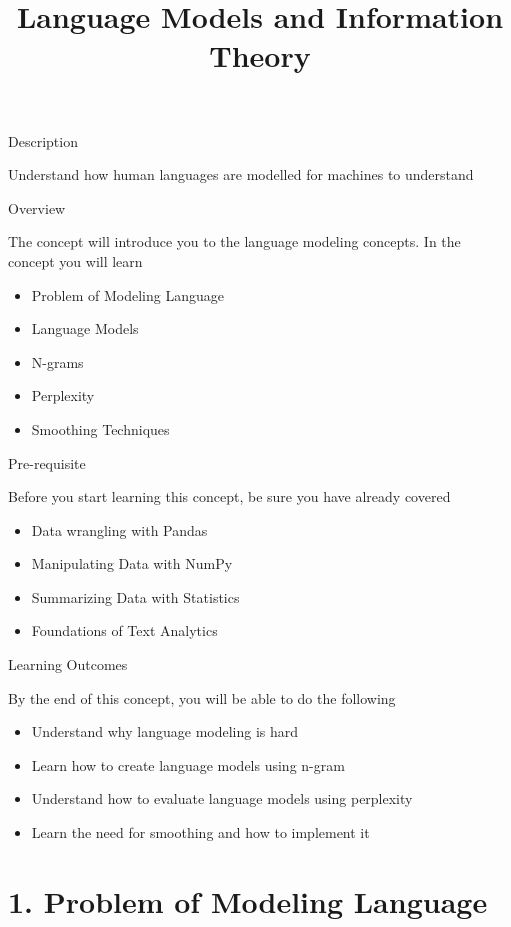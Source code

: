 \documentclass[11pt]{article}
\title{Language Models and Information Theory}
\providecommand{\tightlist}{%
      \setlength{\itemsep}{0pt}\setlength{\parskip}{0pt}}
\begin{document}
    
    
    \maketitle
    
    

    
    Description

Understand how human languages are modelled for machines to understand

Overview

The concept will introduce you to the language modeling concepts. In the
concept you will learn

\begin{itemize}
\item
  Problem of Modeling Language
\item
  Language Models
\item
  N-grams
\item
  Perplexity
\item
  Smoothing Techniques
\end{itemize}

Pre-requisite

Before you start learning this concept, be sure you have already covered

\begin{itemize}
\tightlist
\item
  Data wrangling with Pandas
\item
  Manipulating Data with NumPy
\item
  Summarizing Data with Statistics
\item
  Foundations of Text Analytics
\end{itemize}

Learning Outcomes

By the end of this concept, you will be able to do the following

\begin{itemize}
\item
  Understand why language modeling is hard
\item
  Learn how to create language models using n-gram
\item
  Understand how to evaluate language models using perplexity
\item
  Learn the need for smoothing and how to implement it
\end{itemize}

    \hypertarget{problem-of-modeling-language}{%
\section{1. Problem of Modeling
Language}\label{problem-of-modeling-language}}
\end{document}
